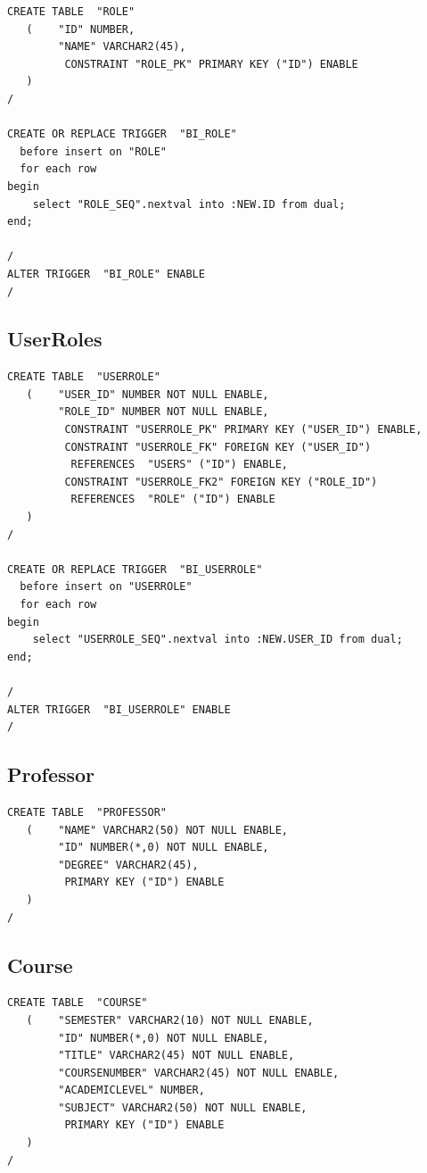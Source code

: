 \documentclass[11pt]{article}
\begin{document}
\begin{verbatim}
CREATE TABLE  "ROLE" 
   (    "ID" NUMBER, 
        "NAME" VARCHAR2(45), 
         CONSTRAINT "ROLE_PK" PRIMARY KEY ("ID") ENABLE
   )
/

CREATE OR REPLACE TRIGGER  "BI_ROLE" 
  before insert on "ROLE"               
  for each row  
begin   
    select "ROLE_SEQ".nextval into :NEW.ID from dual; 
end; 

/
ALTER TRIGGER  "BI_ROLE" ENABLE
/
\end{verbatim}
\subsection{UserRoles}
\label{sec-4-3}



\begin{verbatim}
CREATE TABLE  "USERROLE" 
   (    "USER_ID" NUMBER NOT NULL ENABLE, 
        "ROLE_ID" NUMBER NOT NULL ENABLE, 
         CONSTRAINT "USERROLE_PK" PRIMARY KEY ("USER_ID") ENABLE, 
         CONSTRAINT "USERROLE_FK" FOREIGN KEY ("USER_ID")
          REFERENCES  "USERS" ("ID") ENABLE, 
         CONSTRAINT "USERROLE_FK2" FOREIGN KEY ("ROLE_ID")
          REFERENCES  "ROLE" ("ID") ENABLE
   )
/

CREATE OR REPLACE TRIGGER  "BI_USERROLE" 
  before insert on "USERROLE"               
  for each row  
begin   
    select "USERROLE_SEQ".nextval into :NEW.USER_ID from dual; 
end; 

/
ALTER TRIGGER  "BI_USERROLE" ENABLE
/
\end{verbatim}
\subsection{Professor}
\label{sec-4-4}



\begin{verbatim}
CREATE TABLE  "PROFESSOR" 
   (    "NAME" VARCHAR2(50) NOT NULL ENABLE, 
        "ID" NUMBER(*,0) NOT NULL ENABLE, 
        "DEGREE" VARCHAR2(45), 
         PRIMARY KEY ("ID") ENABLE
   )
/
\end{verbatim}
\subsection{Course}
\label{sec-4-5}



\begin{verbatim}
CREATE TABLE  "COURSE" 
   (    "SEMESTER" VARCHAR2(10) NOT NULL ENABLE, 
        "ID" NUMBER(*,0) NOT NULL ENABLE, 
        "TITLE" VARCHAR2(45) NOT NULL ENABLE, 
        "COURSENUMBER" VARCHAR2(45) NOT NULL ENABLE, 
        "ACADEMICLEVEL" NUMBER, 
        "SUBJECT" VARCHAR2(50) NOT NULL ENABLE, 
         PRIMARY KEY ("ID") ENABLE
   )
/
\end{verbatim}
\end{document}
